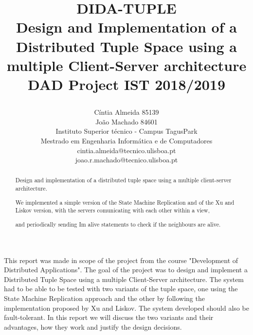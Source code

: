 \documentclass[times, 10pt,two column]{article}
\begin{document}
\title{\begin{center}
    DIDA-TUPLE\\ 
    Design and Implementation of a Distributed Tuple Space using a multiple Client-Server architecture
  \\ DAD Project IST 2018/2019       
    \end{center}}

\author{
C\'intia Almeida 85139\\Jo\~ao Machado 84601\\
Instituto Superior t\'ecnico - Campus TagusPark \\ Mestrado em Engenharia Inform\'atica e de Computadores\\
cintia.almeida@tecnico.ulisboa.pt\\joao.r.machado@tecnico.ulisboa.pt\\
}

\maketitle
\thispagestyle{empty}

\begin{abstract}

Design and implementation of a distributed tuple space using a multiple client-server architecture.

We implemented a simple version of the State Machine Replication and of the Xu and Liskov version, with the servers comunicating with each other within a view,

and periodically sending Im alive statements to check if the neighbours are alive.


\end{abstract}




This report was made in scope of the project from the course "Development of Distributed Applications". The goal of the project was to design and implement a Distributed Tuple Space using a multiple Client-Server architecture. 
The system had to be able to be tested with two variants of the tuple space, one using the State Machine Replication approach and the other by following the implementation proposed by Xu and Liskov. The system developed should also be fault-tolerant. In this report we will discuss the two variants and their advantages, how they work and justify the design decisions.
\end{document}
